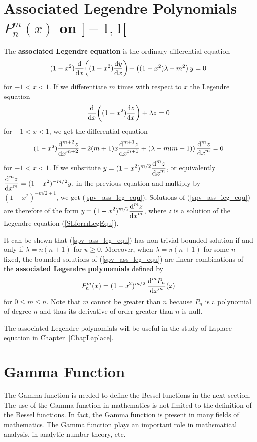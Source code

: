 \section{Associated Legendre Polynomials
$\displaystyle P_n^m(x)$ on $]-1,1[$}

The {\bfseries associated Legendre equation} is the ordinary differential equation
\begin{equation} \label{spv_ass_leg_equ}
(1-x^2) \dfdx{ \left( (1-x^2) \dydx{y}{x} \right) }{x} +
\left( (1-x^2)\lambda - m^2 \right) y = 0
\end{equation}
for $-1 < x < 1$.  If we differentiate $m$ times with respect to $x$
the Legendre equation
\begin{equation} \label{SLformLegEqu}
\dfdx{ \left( (1-x^2) \dydx{z}{x}\right)}{x} + \lambda z = 0
\end{equation}
for $-1<x<1$, we get the differential equation
\[
(1-x^2) \dydxn{z}{x}{m+2} - 2(m+1)x \dydxn{z}{x}{m+1} +
\left( \lambda - m(m+1)\right) \dydxn{z}{x}{m} = 0
\]
for $-1<x<1$.  If we substitute
$\displaystyle y = (1-x^2)^{m/2}\dydxn{z}{x}{m}$,
or equivalently $\displaystyle \dydxn{z}{x}{m} = (1-x^2)^{-m/2} y$,
in the previous equation and multiply by
$\displaystyle (1-x^2)^{-m/2 +1}$, we get
(\ref{spv_ass_leg_equ}).  Solutions of (\ref{spv_ass_leg_equ}) are
therefore of the form $\displaystyle y = (1-x^2)^{m/2}\dydxn{z}{x}{m}$,
where $z$ is a solution of the Legendre equation (\ref{SLformLegEqu}).

It can be shown that (\ref{spv_ass_leg_equ}) has non-trivial bounded
solution if and only if $\lambda = n(n+1)$ for $n\geq 0$. 
Moreover, when $\lambda = n(n+1)$ for some $n$ fixed, the bounded solutions
of (\ref{spv_ass_leg_equ}) are linear combinations of the
{\bfseries associated Legendre polynomials} defined by 
\[
P_n^m(x) = (1-x^2)^{m/2}\, \dydxn{P_n}{x}{m}(x)
\]
for $0 \leq m \leq n$.  Note that $m$ cannot be greater than $n$
because $P_n$ is a polynomial of degree $n$ and thus its derivative of
order greater than $n$ is null.

The associated Legendre polynomials will be useful in the study of
Laplace equation in Chapter~\ref{ChapLaplace}.

\section{Gamma Function}

The Gamma function is needed to define the Bessel functions in the next
section.  The use of the Gamma function in mathematics is not
limited to the definition of the Bessel functions.  In fact, the Gamma
function is present in many fields of mathematics.  The Gamma function
plays an important role in mathematical analysis, in analytic number
theory, etc.

